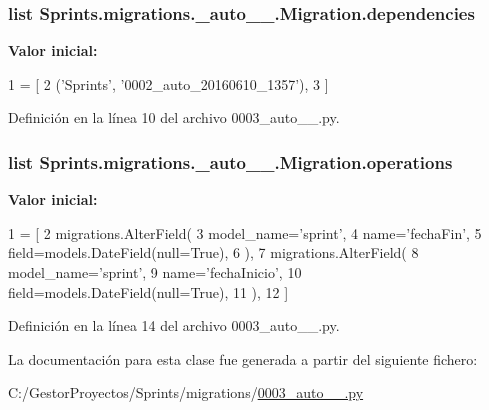 \subsubsection[{\texorpdfstring{dependencies}{dependencies}}]{\setlength{\rightskip}{0pt plus 5cm}list Sprints.\+migrations.\+\_\+auto\+\_\+\_.\+Migration.\+dependencies\hspace{0.3cm}{\ttfamily [static]}}\hypertarget{class_sprints_1_1migrations_1_10003__auto__20160610__2303_1_1_migration_a8de964b6617ae571e89361bb47f0997e}{}\label{class_sprints_1_1migrations_1_10003__auto__20160610__2303_1_1_migration_a8de964b6617ae571e89361bb47f0997e}
{\bfseries Valor inicial\+:}
\begin{DoxyCode}
1 = [
2         (\textcolor{stringliteral}{'Sprints'}, \textcolor{stringliteral}{'0002\_auto\_20160610\_1357'}),
3     ]
\end{DoxyCode}


Definición en la línea 10 del archivo 0003\+\_\+auto\+\_\+\_.\+py.

\subsubsection[{\texorpdfstring{operations}{operations}}]{\setlength{\rightskip}{0pt plus 5cm}list Sprints.\+migrations.\+\_\+auto\+\_\+\_.\+Migration.\+operations\hspace{0.3cm}{\ttfamily [static]}}\hypertarget{class_sprints_1_1migrations_1_10003__auto__20160610__2303_1_1_migration_aabe88073bde65b06ab92e76be88350f0}{}\label{class_sprints_1_1migrations_1_10003__auto__20160610__2303_1_1_migration_aabe88073bde65b06ab92e76be88350f0}
{\bfseries Valor inicial\+:}
\begin{DoxyCode}
1 = [
2         migrations.AlterField(
3             model\_name=\textcolor{stringliteral}{'sprint'},
4             name=\textcolor{stringliteral}{'fechaFin'},
5             field=models.DateField(null=\textcolor{keyword}{True}),
6         ),
7         migrations.AlterField(
8             model\_name=\textcolor{stringliteral}{'sprint'},
9             name=\textcolor{stringliteral}{'fechaInicio'},
10             field=models.DateField(null=\textcolor{keyword}{True}),
11         ),
12     ]
\end{DoxyCode}


Definición en la línea 14 del archivo 0003\+\_\+auto\+\_\+\_.\+py.



La documentación para esta clase fue generada a partir del siguiente fichero\+:\begin{DoxyCompactItemize}
\item 
C\+:/\+Gestor\+Proyectos/\+Sprints/migrations/\hyperlink{0003__auto__20160610__2303_8py}{0003\+\_\+auto\+\_\+\_.\+py}\end{DoxyCompactItemize}
